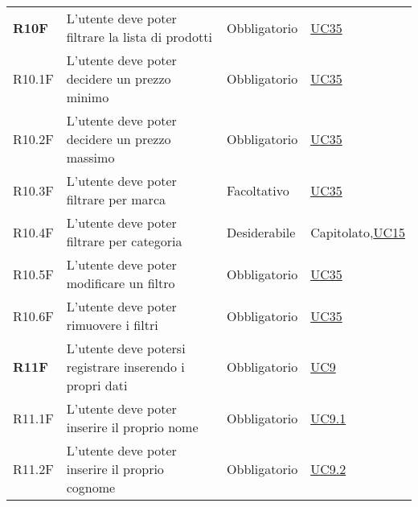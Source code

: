 \begin{center}
\begin{longtable}[!h]{p{50px} p{245px} p{75px} p{50px}}
        \textbf{R10F}                         & L'utente deve poter filtrare la lista di prodotti                                                   & Obbligatorio             & \hyperref[sec:UC35]{UC35}                      \\
        R10.1F                                & L'utente deve poter decidere un prezzo minimo                                                       & Obbligatorio             & \hyperref[sec:UC35]{UC35}                      \\
        R10.2F                                & L'utente deve poter decidere un prezzo massimo                                                      & Obbligatorio             & \hyperref[sec:UC35]{UC35}                      \\
        R10.3F                                & L'utente deve poter filtrare per marca                                                              & Facoltativo              & \hyperref[sec:UC35]{UC35}                      \\
        R10.4F                                & L'utente deve poter filtrare per categoria                                                          & Desiderabile             & Capitolato,\newline \hyperref[sec:UC15]{UC15}                      \\
        R10.5F                                & L'utente deve poter modificare un filtro                                                            & Obbligatorio             & \hyperref[sec:UC35]{UC35}                      \\
        R10.6F                                & L'utente deve poter rimuovere i filtri                                                              & Obbligatorio             & \hyperref[sec:UC35]{UC35}                      \\
        \textbf{R11F}                         & L'utente deve potersi registrare inserendo i propri dati                                            & Obbligatorio             & \hyperref[sec:UC9]{UC9}                        \\
        R11.1F                                & L'utente deve poter inserire il proprio nome                                                        & Obbligatorio             & \hyperref[sec:UC9.1]{UC9.1}                    \\
        R11.2F                                & L'utente deve poter inserire il proprio cognome                                                     & Obbligatorio             & \hyperref[sec:UC9.2]{UC9.2}                    \\

\end{longtable}
\end{center}
